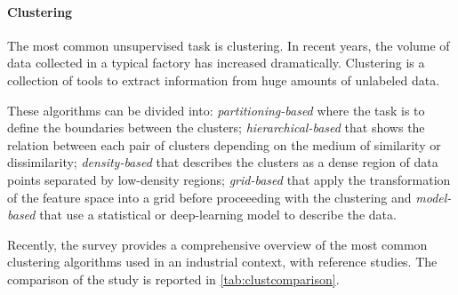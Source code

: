 \paragraph*{Clustering}
The most common unsupervised task is clustering. In recent years, the volume of data collected in a typical factory has increased dramatically. Clustering is a collection of tools to extract information from huge amounts of unlabeled data. 

These algorithms can be divided into: \emph{partitioning-based} where the task is to define the boundaries between the clusters; \emph{hierarchical-based} that shows the relation between each pair of clusters depending on the medium of similarity or dissimilarity; \emph{density-based} that describes the clusters as a dense region of data points separated by low-density regions; \emph{grid-based} that apply the transformation of the feature space into a grid before proceeeding with the clustering and \emph{model-based} that use a statistical or deep-learning model to describe the data.

Recently, the survey \cite{Abla2019survey} provides a comprehensive overview of the most common clustering algorithms used in an industrial context, with reference studies. The comparison of the study is reported in \autoref{tab:clustcomparison}.

{\small}